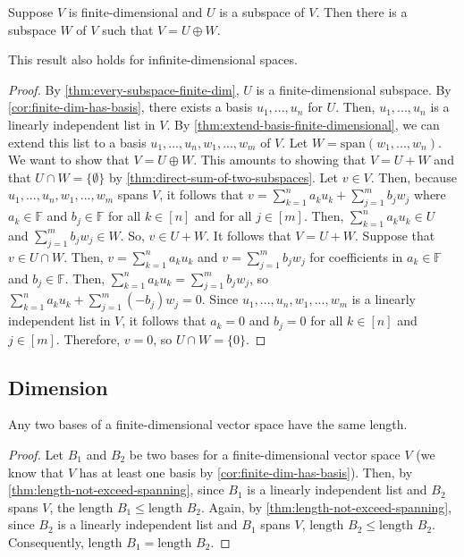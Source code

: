 \documentclass{article}
\begin{document}
\begin{theorem}
  Suppose $V$ is finite-dimensional and $U$ is a subspace of $V$. Then
  there is a subspace $W$ of $V$ such that $V = U \oplus W$.
\end{theorem}
\begin{remark}
  This result also holds for infinite-dimensional spaces.
\end{remark}
\begin{proof}
  By \cref{thm:every-subspace-finite-dim}, $U$ is a finite-dimensional
  subspace. By \cref{cor:finite-dim-has-basis}, there
  exists a basis $u_1, ..., u_n$ for $U$. Then, $u_1, ..., u_n$ is a
  linearly independent list in $V$. By
  \cref{thm:extend-basis-finite-dimensional}, we can extend this list
  to a basis $u_1, ..., u_n, w_1, ..., w_m$ of $V$. Let $W =
  \text{span}(w_1, ..., w_n)$. We want to show that $V = U \oplus
  W$. This amounts to showing that $V = U + W$ and that $U \cap W =
  \{\emptyset\}$ by \cref{thm:direct-sum-of-two-subspaces}. Let $v \in
  V$. Then, because $u_1, ..., u_n, w_1, ..., w_m$ spans $V$, it
  follows that $v = \sum_{k=1}^n a_k u_k + \sum_{j=1}^m b_j w_j$ where
  $a_k \in \mathbb{F}$ and $b_j \in \mathbb{F}$ for all $k \in [n]$
  and for all $j \in [m]$. Then, $\sum_{k=1}^n a_k u_k \in U$ and
  $\sum_{j=1}^m b_j w_j \in W$. So, $v \in U + W$. It follows that $V
  = U + W$. Suppose that $v \in U \cap W$. Then, $v = \sum_{k=1}^n a_k
  u_k$ and $v = \sum_{j=1}^m b_j w_j$ for coefficients in $a_k \in
  \mathbb{F}$ and $b_j \in \mathbb{F}$. Then, $\sum_{k=1}^n a_k u_k =
  \sum_{j=1}^m b_j w_j$, so $\sum_{k=1}^n a_k u_k + \sum_{j=1}^m
  (-b_j) w_j = 0$. Since $u_1, ..., u_n, w_1, ..., w_m$ is a linearly
  independent list in $V$, it follows that $a_k = 0$ and $b_j = 0$ for
  all $k \in [n]$ and $j \in [m]$. Therefore, $v = 0$, so $U \cap W = \{0\}$.
\end{proof}

\subsection{Dimension}

\begin{theorem}
  \label{thm:basis-length-does-not-depend-on-basis}
  Any two bases of a finite-dimensional vector space have the same length.
\end{theorem}
\begin{proof}
  Let $B_1$ and $B_2$ be two bases for a finite-dimensional vector
  space $V$ (we know that $V$ has at least one basis by
  \cref{cor:finite-dim-has-basis}). Then, by
  \cref{thm:length-not-exceed-spanning}, since $B_1$ is a linearly
  independent list and $B_2$ spans $V$, the $\text{length } B_1 \le
  \text{length } B_2$. Again, by
  \cref{thm:length-not-exceed-spanning}, since $B_2$ is a linearly
  independent list and $B_1$ spans $V$, $\text{length } B_2 \le
  \text{length } B_2$. Consequently, $\text{length } B_1 =
  \text{length } B_2$.
\end{proof}
\end{document}
